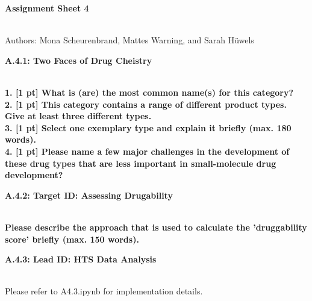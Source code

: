\documentclass[a4paper,10pt]{article}
\begin{document}


\begin{huge}
	\vspace{1cm}
	\textbf{Assignment Sheet 4}
\end{huge} \\

Authors: Mona Scheurenbrand, Mattes Warning, and Sarah Hüwels


\begin{large}
	\vspace{1.0cm}
	\textbf{A.4.1: Two Faces of Drug Cheistry}
\end{large}	\\ [2mm]
\textbf{1. [1 pt] What is (are) the most common name(s) for this category?} \\

\textbf{2. [1 pt] This category contains a range of diﬀerent product types. Give at least three diﬀerent types.} \\

\textbf{3. [1 pt] Select one exemplary type and explain it briefly (max. 180 words).} \\

\textbf{4. [1 pt] Please name a few major challenges in the development of these drug types that are less important in
small-molecule drug development?} \\

\begin{large}
	\vspace{1.0cm}
	\textbf{A.4.2: Target ID: Assessing Drugability}
\end{large}	\\ [2mm]
\textbf{Please describe the approach that is used to calculate the ’druggability score’ briefly (max. 150 words).} \\


\begin{large}
	\vspace{1.0cm}
	\textbf{A.4.3: Lead ID: HTS Data Analysis}
\end{large}	\\ [2mm]


Please refer to A4.3.ipynb for implementation details.



\end{document}
